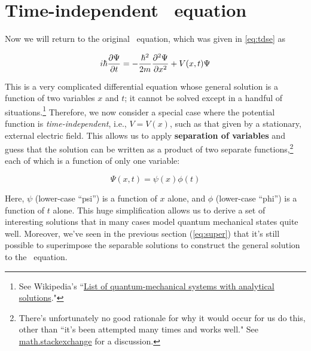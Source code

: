 \section[Time-independence]{Time-independent \Sch\ equation}

Now we will return to the original \Sch\ equation, which was given in \autoref{eq:tdse} as

\begin{equation*}
	i\hbar \pdv{\Psi}{t} = -\frac{\hbar^2}{2m} \pdv[2]{\Psi}{x} + V(x,t)\Psi
\end{equation*}

This is a very complicated differential equation whose general solution is a function of two variables $x$ and $t$;
it cannot be solved except in a handful of situations.\footnote{See Wikipedia's ``\href{https://en.wikipedia.org/wiki/List_of_quantum-mechanical_systems_with_analytical_solutions}{List of quantum-mechanical systems with analytical solutions}."}
Therefore, we now consider a special case where the potential function is \emph{time-independent}, i.e., $V = V(x)$, such as that given by a stationary, external electric field. 
This allows us to apply \textbf{separation of variables} and guess that the solution can be written as a product of two separate functions,\footnote{There's unfortunately no good rationale for why it would occur for us do this, other than ``it's been attempted many times and works well." See \href{https://math.stackexchange.com/questions/575205/why-separation-of-variables-works-in-pdes}{math.stackexchange} for a discussion.}  each of which is a function of only one variable:

\begin{tcolorbox}[title = Separation of variables in the wavefunction] \vspace{-2ex}
	\begin{equation}
		\Psi(x,t) = \psi(x)\phi(t) \label{eq:sep}
	\end{equation}
\end{tcolorbox}

Here, $\psi$ (lower-case ``psi'') is a function of $x$ alone, and $\phi$ (lower-case ``phi'') is a function of $t$ alone. 
This huge simplification allows us to derive a set of interesting solutions that in many cases model quantum mechanical states quite well. 
Moreover, we've seen in the previous section (\autoref{eq:super}) that it's still possible to superimpose the separable solutions to construct the general solution to the \Sch\ equation.

